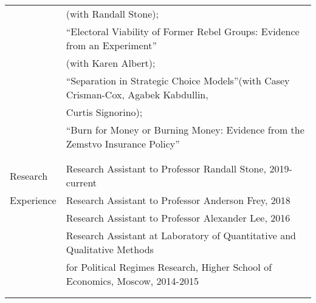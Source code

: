 \documentclass[letterpaper,11pt,oneside]{article}
\begin{document}
\begin{tabular}{@{} l l}
  & (with Randall Stone);\\
   & ``Electoral Viability of Former Rebel Groups: Evidence from an Experiment''\\
   &(with Karen Albert);\\
    &``Separation in Strategic Choice Models''(with Casey Crisman-Cox, Agabek Kabdullin,\\
   &  Curtis Signorino);\\
 & ``Burn for Money or Burning Money: Evidence from the Zemstvo Insurance Policy''\\
&\\
&\\
 \Large{Research} & Research Assistant to Professor Randall Stone, 2019-current\\
 \Large{Experience}&Research Assistant to Professor Anderson Frey, 2018\\
 & Research Assistant to Professor Alexander Lee, 2016\\
 & Research Assistant at Laboratory of Quantitative and Qualitative Methods \\
 &for Political Regimes Research, Higher School of Economics, Moscow, 2014-2015 \\
 &\\
 & \\
        \end{tabular}
 
\end{document}
